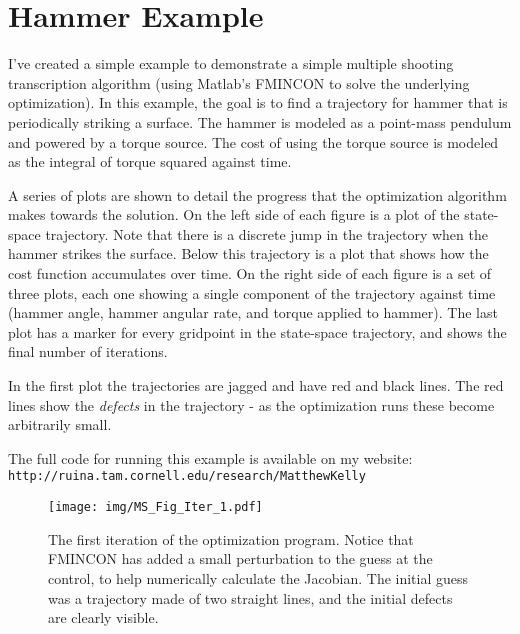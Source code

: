 

\section{Hammer Example}

I've created a simple example to demonstrate a simple multiple shooting transcription algorithm (using Matlab's FMINCON to solve the underlying optimization). In this example, the goal is to find a trajectory for hammer that is periodically striking a surface. The hammer is modeled as a point-mass pendulum and powered by a torque source. The cost of using the torque source is modeled as the integral of torque squared against time.

\par A series of plots are shown to detail the progress that the optimization algorithm makes towards the solution. On the left side of each figure is a plot of the state-space trajectory. Note that there is a discrete jump in the trajectory when the hammer strikes the surface. Below this trajectory is a plot that shows how the cost function accumulates over time. On the right side of each figure is a set of three plots, each one showing a single component of the trajectory against time (hammer angle, hammer angular rate, and torque applied to hammer). The last plot has a marker for every gridpoint in the state-space trajectory, and shows the final number of iterations. 

\par In the first plot the trajectories are jagged and have red and black lines. The red lines show the {\it defects} in the trajectory - as the optimization runs these become arbitrarily small. 

\par The full code for running this example is available on my website: \\
\footnotesize{\texttt{http://ruina.tam.cornell.edu/research/MatthewKelly}}


\FloatBarrier

\onecolumn

\begin{figure} 
    \centering 
    \texttt{[image: img/MS\_Fig\_Iter\_1.pdf]}    
    \caption{The first iteration of the optimization program. Notice that FMINCON has added a small perturbation to the guess at the control, to help numerically calculate the Jacobian. The initial guess was a trajectory made of two straight lines, and the initial defects are clearly visible.}     
    \label{fig: MS_Fig_Iter_1}     
\end{figure} 


